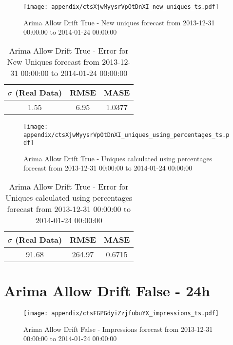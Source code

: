 \begin{figure}[H] \begin{center} \leavevmode
\texttt{[image: appendix/ctsXjwMyysrVpOtDnXI\_new\_uniques\_ts.pdf]} \caption{
Arima Allow Drift True - New uniques forecast from 2013-12-31 00:00:00 to 2014-01-24 00:00:00} \label{fig:appendix/ctsXjwMyysrVpOtDnXI_new_uniques_ts.pdf} \end{center}
\end{figure}

\begin{table}[H]
\centering
\footnotesize
\begin{tabular}{ccc}
$\sigma$ (Real Data) & RMSE & MASE   \\ \hline
1.55 & 6.95 & 1.0377 \\
\end{tabular}

\vspace{0.5cm}

\caption{
Arima Allow Drift True - Error for New Uniques forecast from 2013-12-31 00:00:00 to 2014-01-24 00:00:00}
\end{table}

\begin{figure}[H] \begin{center} \leavevmode
\texttt{[image: appendix/ctsXjwMyysrVpOtDnXI\_uniques\_using\_percentages\_ts.pdf]} \caption{
Arima Allow Drift True - Uniques calculated using percentages forecast from 2013-12-31 00:00:00 to 2014-01-24 00:00:00} \label{fig:appendix/ctsXjwMyysrVpOtDnXI_uniques_using_percentages_ts.pdf} \end{center}
\end{figure}

\begin{table}[H]
\centering
\footnotesize
\begin{tabular}{ccc}
$\sigma$ (Real Data) & RMSE & MASE   \\ \hline
91.68 & 264.97 & 0.6715 \\
\end{tabular}

\vspace{0.5cm}

\caption{
Arima Allow Drift True - Error for Uniques calculated using percentages forecast from 2013-12-31 00:00:00 to 2014-01-24 00:00:00}
\end{table}

\section{Arima Allow Drift False - 24h}
\begin{figure}[H] \begin{center} \leavevmode
\texttt{[image: appendix/ctsFGPGdyiZzjfubuYX\_impressions\_ts.pdf]} \caption{
Arima Allow Drift False - Impressions forecast from 2013-12-31 00:00:00 to 2014-01-24 00:00:00} \label{fig:appendix/ctsFGPGdyiZzjfubuYX_impressions_ts.pdf} \end{center}
\end{figure}

